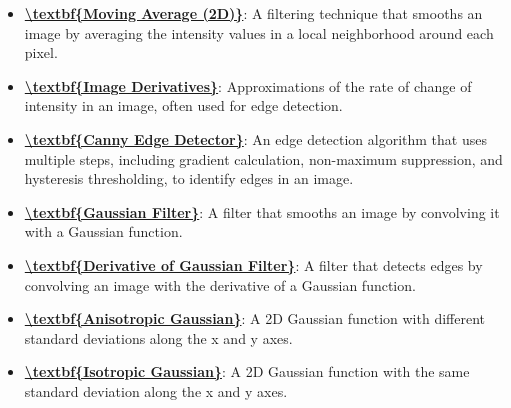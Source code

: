 \documentclass{article}%
\begin{document}
\begin{itemize}[leftmargin=*]
\item \href{https://www.math.purdue.edu/~yipn/351/08L2-Feature Extraction.pdf#page=16}{\textbf{\textbackslash{}textbf\{Moving Average (2D)\}}}: A filtering technique that smooths an image by averaging the intensity values in a local neighborhood around each pixel.%
\item \href{https://www.math.purdue.edu/~yipn/351/08L2-Feature Extraction.pdf#page=15}{\textbf{\textbackslash{}textbf\{Image Derivatives\}}}: Approximations of the rate of change of intensity in an image, often used for edge detection.%
\item \href{https://www.math.purdue.edu/~yipn/351/08L2-Feature Extraction.pdf#page=19}{\textbf{\textbackslash{}textbf\{Canny Edge Detector\}}}: An edge detection algorithm that uses multiple steps, including gradient calculation, non-maximum suppression, and hysteresis thresholding, to identify edges in an image.%
\item \href{https://www.math.purdue.edu/~yipn/351/08L2-Feature Extraction.pdf#page=38}{\textbf{\textbackslash{}textbf\{Gaussian Filter\}}}: A filter that smooths an image by convolving it with a Gaussian function.%
\item \href{https://www.math.purdue.edu/~yipn/351/08L2-Feature Extraction.pdf#page=40}{\textbf{\textbackslash{}textbf\{Derivative of Gaussian Filter\}}}: A filter that detects edges by convolving an image with the derivative of a Gaussian function.%
\item \href{https://www.math.purdue.edu/~yipn/351/08L2-Feature Extraction.pdf#page=43}{\textbf{\textbackslash{}textbf\{Anisotropic Gaussian\}}}: A 2D Gaussian function with different standard deviations along the x and y axes.%
\item \href{https://www.math.purdue.edu/~yipn/351/08L2-Feature Extraction.pdf#page=43}{\textbf{\textbackslash{}textbf\{Isotropic Gaussian\}}}: A 2D Gaussian function with the same standard deviation along the x and y axes.%
\end{itemize}%
\end{document}
